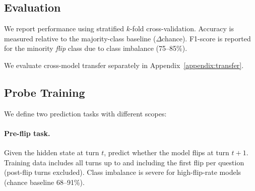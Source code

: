\documentclass[11pt]{article}
\begin{document}
\subsection{Evaluation}
\label{subsec:evaluation}

We report performance using stratified $k$-fold cross-validation. Accuracy is measured relative
to the majority-class baseline ($\Delta$chance). F1-score is reported for the minority
\textit{flip} class due to class imbalance (75--85\%).

We evaluate cross-model transfer separately in Appendix~\ref{appendix:transfer}.




\subsection{Probe Training}
\label{subsec:probe-training}

We define two prediction tasks with different scopes:

\paragraph{Pre-flip task.} Given the hidden state at turn $t$, predict whether the model flips
at turn $t+1$. Training data includes all turns up to and including the first flip per question
(post-flip turns excluded). Class imbalance is severe for high-flip-rate models (chance
baseline 68--91\%).
\end{document}
